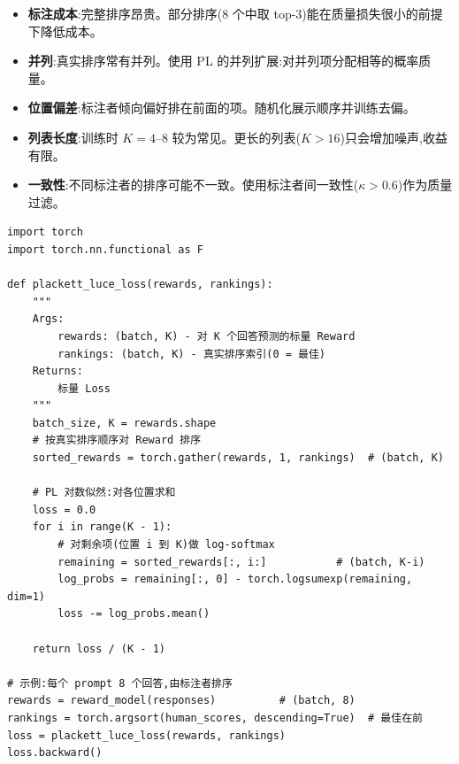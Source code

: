 \begin{warningbox}
\begin{itemize}
  \item \textbf{标注成本}:完整排序昂贵。部分排序(8 个中取 top-3)能在质量损失很小的前提下降低成本。
  \item \textbf{并列}:真实排序常有并列。使用 PL 的并列扩展:对并列项分配相等的概率质量。
  \item \textbf{位置偏差}:标注者倾向偏好排在前面的项。随机化展示顺序并训练去偏。
  \item \textbf{列表长度}:训练时 $K=4$--8 较为常见。更长的列表($K>16$)只会增加噪声,收益有限。
  \item \textbf{一致性}:不同标注者的排序可能不一致。使用标注者间一致性($\kappa > 0.6$)作为质量过滤。
\end{itemize}
\end{warningbox}

\begin{examplebox}
\begin{lstlisting}[style=pythonstyle]
import torch
import torch.nn.functional as F

def plackett_luce_loss(rewards, rankings):
    """
    Args:
        rewards: (batch, K) - 对 K 个回答预测的标量 Reward
        rankings: (batch, K) - 真实排序索引(0 = 最佳)
    Returns:
        标量 Loss
    """
    batch_size, K = rewards.shape
    # 按真实排序顺序对 Reward 排序
    sorted_rewards = torch.gather(rewards, 1, rankings)  # (batch, K)

    # PL 对数似然:对各位置求和
    loss = 0.0
    for i in range(K - 1):
        # 对剩余项(位置 i 到 K)做 log-softmax
        remaining = sorted_rewards[:, i:]           # (batch, K-i)
        log_probs = remaining[:, 0] - torch.logsumexp(remaining, dim=1)
        loss -= log_probs.mean()

    return loss / (K - 1)

# 示例:每个 prompt 8 个回答,由标注者排序
rewards = reward_model(responses)          # (batch, 8)
rankings = torch.argsort(human_scores, descending=True)  # 最佳在前
loss = plackett_luce_loss(rewards, rankings)
loss.backward()
\end{lstlisting}
\end{examplebox}

